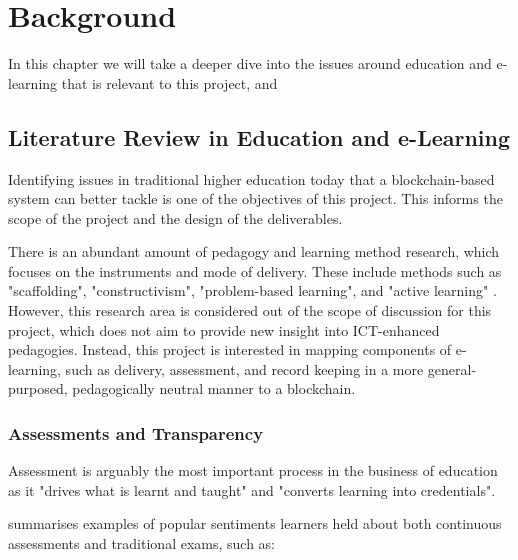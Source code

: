 
\chapter{Background}
\graphicspath{{Chapter2/Figs/Raster/}{Chapter2/Figs/PDF/}{Chapter2/Figs/}}
In this chapter we will take a deeper dive into the issues around education and e-learning that
is relevant to this project, and

\section{Literature Review in Education and e-Learning}

Identifying issues in traditional higher education today that a blockchain-based system can better
tackle is one of the objectives of this project. This informs the scope of the
project and the design of the deliverables.

There is an abundant amount of pedagogy and learning method research, which focuses on the
instruments and mode of delivery. These include methods such as "scaffolding", "constructivism",
"problem-based learning", and "active learning" \citep{ali2005effective}. However, this
research area is considered out of the scope of discussion for this project, which does not
aim to provide new insight into ICT-enhanced pedagogies. Instead, this project is interested in
mapping components of e-learning, such as delivery, assessment, and record keeping
in a more general-purposed, pedagogically neutral manner to a blockchain.

\subsection{Assessments and Transparency}

Assessment is arguably the most important process in the business of education as it "drives what
is learnt and taught" and "converts learning into credentials". \citep[p.160]{campbell2010digital}

\citet{brown1999assessment} summarises examples of popular sentiments learners held about both
continuous assessments and traditional exams, such as:

